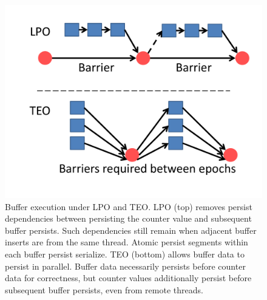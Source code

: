\begin{figure}
\centering
\includegraphics[width=\textwidth]{PMC_patterns/buffer_PEO_LPO.pdf}
\caption{Buffer execution under LPO and TEO.  LPO (top) removes persist dependencies between persisting the counter value and subsequent buffer persists.  Such dependencies still remain when adjacent buffer inserts are from the same thread.  Atomic persist segments within each buffer persist serialize.  TEO (bottom) allows buffer data to persist in parallel.  Buffer data necessarily persists before counter data for correctness, but counter values additionally persist before subsequent buffer persists, even from remote threads.}
\label{figure::buffer_PEO_LPO}
\end{figure}
